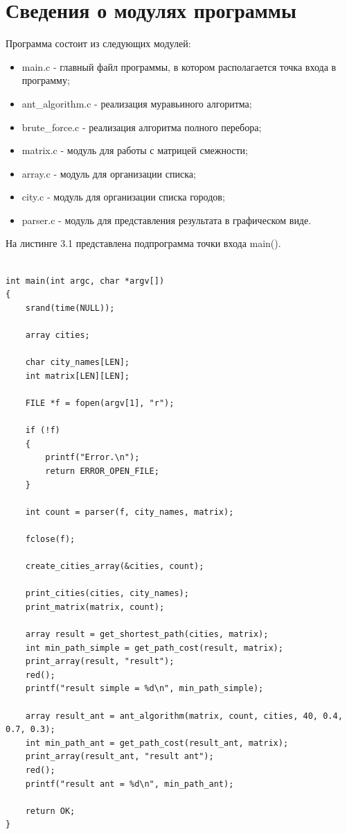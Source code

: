 \documentclass[12pt]{report}
\begin{document}
\section{Сведения о модулях программы}
Программа состоит из следующих модулей:
\begin{itemize}
	\item main.c - главный файл программы, в котором располагается точка входа в программу;
	\item ant\_algorithm.c - реализация муравьиного алгоритма;
	\item brute\_force.c - реализация алгоритма полного перебора;
	\item matrix.c - модуль для работы с матрицей смежности;
	\item array.c - модуль для организации списка;
	\item city.c - модуль для организации списка городов;
	\item parser.c - модуль для представления результата в графическом виде.
\end{itemize}

На листинге 3.1 представлена подпрограмма точки входа main().
\begin{lstlisting}[label=some-code,caption= Код подпрограммы main()]

int main(int argc, char *argv[])
{
    srand(time(NULL));

    array cities; 

    char city_names[LEN]; 
    int matrix[LEN][LEN]; 

    FILE *f = fopen(argv[1], "r");

    if (!f)
    {
        printf("Error.\n");
        return ERROR_OPEN_FILE;
    }

    int count = parser(f, city_names, matrix);

    fclose(f);

    create_cities_array(&cities, count);

    print_cities(cities, city_names);
    print_matrix(matrix, count);

    array result = get_shortest_path(cities, matrix);
    int min_path_simple = get_path_cost(result, matrix);
    print_array(result, "result");
    red();
    printf("result simple = %d\n", min_path_simple);

    array result_ant = ant_algorithm(matrix, count, cities, 40, 0.4, 0.7, 0.3);
    int min_path_ant = get_path_cost(result_ant, matrix);
    print_array(result_ant, "result ant");
    red();
    printf("result ant = %d\n", min_path_ant);

    return OK;
}
\end{lstlisting}
\end{document}
